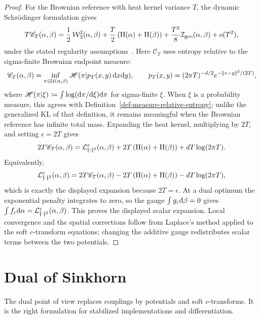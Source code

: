 \begin{proof}
	For the Brownian reference with heat kernel variance $T$, the dynamic Schr\"odinger formulation gives
	\[
		T\mathscr C_T(\alpha,\beta)
		=
		\frac12\operatorname{\mathcal{W}}_2^2(\alpha,\beta)
		+\frac{T}{2}\left( \mathrm H(\alpha)+\mathrm H(\beta) \right)
		+\frac{T^2}{8}\mathcal I_{\rm geo}(\alpha,\beta)+o(T^2),
	\]
	under the stated regularity assumptions~\cite{ConfortiTamanini2021EntropicDerivative}. Here $\mathscr C_T$ uses entropy relative to the sigma-finite Brownian endpoint measure:
	\[
		\mathscr C_T(\alpha,\beta)
		=
		\inf_{\pi\in\mathcal{U}(\alpha,\beta)}
		\mathscr H(\pi|p_T(x,y)\,\mathrm{d} x\mathrm{d} y),
		\qquad
		p_T(x,y)=(2\pi T)^{-d/2}e^{-|\!| x-y |\!|^2/(2T)},
	\]
	where $\mathscr H(\pi|\xi)\coloneqq\int\log(\mathrm{d}\pi/\mathrm{d}\xi)\mathrm{d}\pi$ for sigma-finite $\xi$. When $\xi$ is a probability measure, this agrees with Definition~\ref{def-measure-relative-entropy}; unlike the generalized KL of that definition, it remains meaningful when the Brownian reference has infinite total mass. Expanding the heat kernel, multiplying by $2T$, and setting $\epsilon=2T$ gives
	\[
		2T\mathscr C_T(\alpha,\beta)
		=
		\mathcal{L}_{|\!| \cdot |\!|^2}^{\varepsilon}(\alpha,\beta)
		+2T\left( \mathrm H(\alpha)+\mathrm H(\beta) \right)
		+dT\log(2\pi T).
	\]
	Equivalently,
	\[
		\mathcal{L}_{|\!| \cdot |\!|^2}^{\varepsilon}(\alpha,\beta)
		=
		2T\mathscr C_T(\alpha,\beta)
		-2T\left( \mathrm H(\alpha)+\mathrm H(\beta) \right)
		-dT\log(2\pi T),
	\]
	which is exactly the displayed expansion because $2T=\epsilon$. At a dual optimum the exponential penalty integrates to zero, so the gauge $\int g_\varepsilon\mathrm{d}\beta=0$ gives $\int f_\varepsilon\mathrm{d}\alpha=\mathcal{L}_{|\!| \cdot |\!|^2}^\varepsilon(\alpha,\beta)$. This proves the displayed scalar expansion. Local convergence and the spatial corrections follow from Laplace's method applied to the soft $c$-transform equations; changing the additive gauge redistributes scalar terms between the two potentials.
\end{proof}


\section{Dual of Sinkhorn}\label{sec-dual-sinkhorn}

The dual point of view replaces couplings by potentials and soft $c$-transforms. It is the right formulation for stabilized implementations and differentiation.

